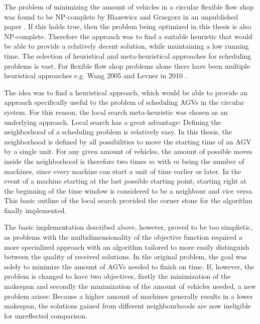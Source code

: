 The problem of minimizing the amount of vehicles in a circular flexible flow shop was found to be NP-complete by Blazewicz and Grzegorz in an unpublished paper \cite{blazewicz1111}. If this
holds true, then the problem being optimized in this thesis is also NP-complete. Therefore the approach was to find a suitable heuristic that would be able to provide a relatively decent
solution, while maintaining a low running time. The selection of heuristical and meta-heuristical approaches for scheduling problems is vast. For
flexible flow shop problems alone there have been multiple heuristical approaches e.g. Wang 2005 \cite{wang2005} and Levner in 2010 \cite{levner2010}.

The idea was to find a heuristical approach, which would be able to provide an approach specifically useful to the problem of scheduling AGVs in the circular system. For this reason,
the local search meta-heuristic was chosen as an underlying approach. Local search has a great advantage: Defining the neighborhood of
a scheduling problem is relatively easy. In this thesis, the neighborhood is defined by all possibilities to move the starting time of an AGV by
a single unit. For any given amount of vehicles, the amount of possible moves inside the neighborhood is therefore two times \(m\) with \(m\) being the number of machines, since every machine
can start a unit of time earlier or later. In the event of a machine starting at the last possible starting point, starting right at the beginning
of the time window is considered to be a neighbour and vice versa. This basic outline of the local search provided the corner stone for the algorithm
finally implemented. 

The basic implementation described above, however, proved to be too simplistic, as problems with the multidimensionality of the objective function required a more specialized approach with an algorithm
tailored to more easily distinguish between the quality of received solutions. In the original problem, the goal was solely to minimize the amount of AGVs needed to finish on time. If, however, the problem is changed to
have two objectives, firstly the minimization of the makespan and secondly the minimization of the amount of vehicles needed, a new problem arises: 
Because a higher amount of machines generally results in a lower makespan, the solutions gained from different neighbourhoods are now ineligible for unreflected comparison.

